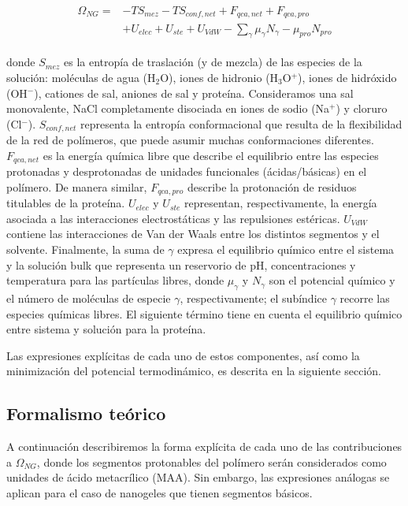 \begin{align}
\begin{aligned}
\Omega_{NG}=& -TS_{mez} -TS_{conf,net} + F_{qca,net} + F_{qca,pro}\\
& + U_{elec} + U_{ste} + U_{VdW} - \sum_{\gamma}{\mu_\gamma N_\gamma} - \mu_{pro} N_{pro}
\end{aligned}
\label{eq:esf:semicano}
\end{align}


\noindent donde $S_{mez}$ es la entrop\'ia de traslaci\'on (y de mezcla) de las especies de la soluci\'on: mol\'eculas de agua (H$_2$O), iones de hidronio (H$_3$O$^+$), iones de hidr\'oxido (OH$^- $), cationes de sal, aniones de sal y prote\'ina.
Consideramos una sal monovalente, NaCl completamente disociada en iones de sodio (Na$^+$) y cloruro (Cl$^-$).
$S_{conf,net}$ representa la entrop\'ia conformacional que resulta de la flexibilidad de la red de pol\'imeros, que puede asumir muchas conformaciones diferentes.
$F_{qca,net}$ es la energ\'ia qu\'imica libre que describe el equilibrio entre las especies protonadas y desprotonadas de unidades funcionales (\'acidas/b\'asicas) en el pol\'imero.
De manera similar, $F_{qca,pro}$ describe la protonaci\'on de residuos titulables de la prote\'ina.
$U_{elec}$ y $U_{ste}$ representan, respectivamente, la energ\'ia asociada a las interacciones electrost\'aticas y las repulsiones est\'ericas.
$U_{VdW}$ contiene las interacciones de Van der Waals entre los distintos segmentos y el solvente.
Finalmente, la suma de $\gamma$ expresa el equilibrio qu\'imico entre el sistema y la soluci\'on bulk que representa un reservorio de pH, concentraciones y temperatura para las part\'iculas libres, donde $\mu_\gamma$ y $N_\gamma$ son el potencial qu\'imico y el n\'umero de mol\'eculas de especie $\gamma$, respectivamente;
el sub\'indice $\gamma$ recorre las especies qu\'imicas libres.
El siguiente t\'ermino tiene en cuenta el equilibrio qu\'imico entre sistema y soluci\'on para la prote\'ina.

Las expresiones expl\'icitas de cada uno de estos componentes, as\'i como la minimizaci\'on del potencial termodin\'amico, es descrita en la siguiente secci\'on.



\subsection{Formalismo te\'orico}\label{sec:esf:tm}

A continuaci\'on describiremos la forma expl\'icita de cada uno de las contribuciones a $\Omega_{NG}$, donde los segmentos protonables del pol\'imero ser\'an considerados como unidades de \'acido metacr\'ilico (MAA). Sin embargo, las expresiones an\'alogas se aplican para el caso de nanogeles que tienen segmentos b\'asicos.

